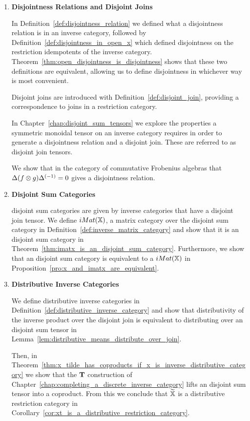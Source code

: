\begin{enumerate}
\item \textbf{Disjointness Relations and Disjoint Joins}

In Definition~\ref{def:disjointness_relation} we defined what a disjointness relation is in an
inverse category, followed by Definition~\ref{def:disjointness_in_open_x} which defined disjointness
on the restriction idempotents of the inverse
category. Theorem~\ref{thm:open_disjointness_is_disjointness} shows that these two definitions are
equivalent, allowing us to define disjointness in whichever way is most convenient.

Disjoint joins are introduced with Definition~\ref{def:disjoint_join}, providing a correspondence to
joins in a restriction category.

In Chapter~\ref{chap:disjoint_sum_tensors} we explore the properties a symmetric monoidal tensor
on an inverse category requires in order to generate a disjointness relation and a disjoint
join. These are referred to as disjoint join tensors.

We show that in the category of commutative Frobenius algebras that $\Delta(f\otimes g){\Delta}^{(-1)} = 0$
gives a disjointness relation.

\item \textbf{Disjoint Sum Categories}

disjoint sum categories are given by inverse categories that have a disjoint join tensor. We define
$iMat({\mathbb{X}})$, a matrix category over the disjoint sum category \X in
Definition~\ref{def:inverse_matrix_category} and show that it is an disjoint sum category in
Theorem~\ref{thm:imatx_is_an_disjoint_sum_category}. Furthermore, we show
that an disjoint sum category \X is equivalent to a $iMat({\mathbb{X}})$ in
Proposition~\ref{pro:x_and_imatx_are_equivalent}.


\item \textbf{Distributive Inverse Categories}

We define distributive inverse categories in Definition~\ref{def:distributive_inverse_category} and
show that distributivity of the inverse product over the disjoint join is equivalent to distributing
over an disjoint sum tensor in Lemma~\ref{lem:distributive_means_distribute_over_join}.

Then, in Theorem~\ref{thm:x_tilde_has_coproducts_if_x_is_inverse_distributive_category} we show that
the $\mathbf{T}$ construction of Chapter~\ref{chap:completing_a_discrete_inverse_category} lifts an disjoint sum
tensor into a coproduct. From this we conclude that $\widetilde{\mathbb{X}}$ is a distributive restriction category in
Corollary~\ref{cor:xt_is_a_distributive_restriction_category}.
\end{enumerate}

